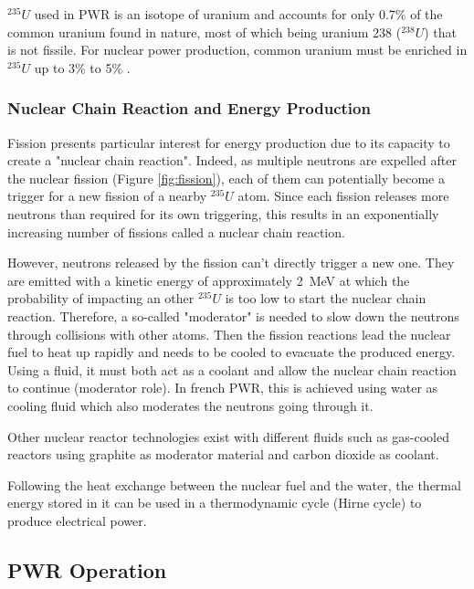 \npar

$^{235}U$ used in PWR is an isotope of uranium and accounts for only 0.7\% of the common uranium found in nature, most of which being uranium 238 ($^{238}U$) that is not fissile. For nuclear power production, common uranium must be enriched in $^{235}U$ up to 3\% to 5\% \cite{croff_introduction_2008}.

\subsubsection{Nuclear Chain Reaction and Energy Production}


Fission presents particular interest for energy production due to its capacity to create a "nuclear chain reaction". Indeed, as multiple neutrons are expelled after the nuclear fission (Figure \ref{fig:fission}), each of them can potentially become a trigger for a new fission of a nearby $^{235}U$ atom. Since each fission releases more neutrons than required for its own triggering, this results in an exponentially increasing number of fissions called a nuclear chain reaction.

\npar

However, neutrons released by the fission can't directly trigger a new one. They are emitted with a kinetic energy of approximately 2~MeV at which the probability of impacting an other $^{235}U$ is too low to start the nuclear chain reaction. Therefore, a so-called "moderator" is needed to slow down the neutrons through collisions with other atoms. Then the fission reactions lead the nuclear fuel to heat up rapidly and needs to be cooled to evacuate the produced energy. Using a fluid, it must both act as a coolant and allow the nuclear chain reaction to continue (moderator role). In french PWR, this is achieved using water as cooling fluid which also moderates the neutrons going through it.

\begin{remark*}{}
Other nuclear reactor technologies exist with different fluids such as gas-cooled reactors using graphite as moderator material and carbon dioxide as coolant.
\end{remark*}

\npar

Following the heat exchange between the nuclear fuel and the water, the thermal energy stored in it can be used in a thermodynamic cycle (\eg Hirne cycle) to produce electrical power.



\subsection{PWR Operation}

